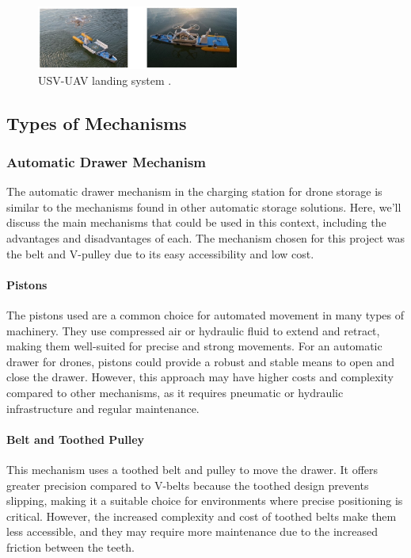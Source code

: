     \begin{figure}[H]
        \centering
        \includegraphics[width=0.6\textwidth]{pictures/mobile_3.png}
        \caption{USV-UAV landing system \cite{grlj_docking_stations}.}
        \label{fig:mobile_charging3}
    \end{figure}


\subsection{Types of Mechanisms}

    \subsubsection{Automatic Drawer Mechanism}
    The automatic drawer mechanism in the charging station for drone storage is similar to the mechanisms found in other automatic storage solutions. Here, we'll discuss the main mechanisms that could be used in this context, including the advantages and disadvantages of each. The mechanism chosen for this project was the belt and V-pulley due to its easy accessibility and low cost.
    
    \paragraph{Pistons} The pistons used are a common choice for automated movement in many types of machinery. They use compressed air or hydraulic fluid to extend and retract, making them well-suited for precise and strong movements. For an automatic drawer for drones, pistons could provide a robust and stable means to open and close the drawer. However, this approach may have higher costs and complexity compared to other mechanisms, as it requires pneumatic or hydraulic infrastructure and regular maintenance.
    
    \paragraph{Belt and Toothed Pulley} This mechanism uses a toothed belt and pulley to move the drawer. It offers greater precision compared to V-belts because the toothed design prevents slipping, making it a suitable choice for environments where precise positioning is critical. However, the increased complexity and cost of toothed belts make them less accessible, and they may require more maintenance due to the increased friction between the teeth.
    
